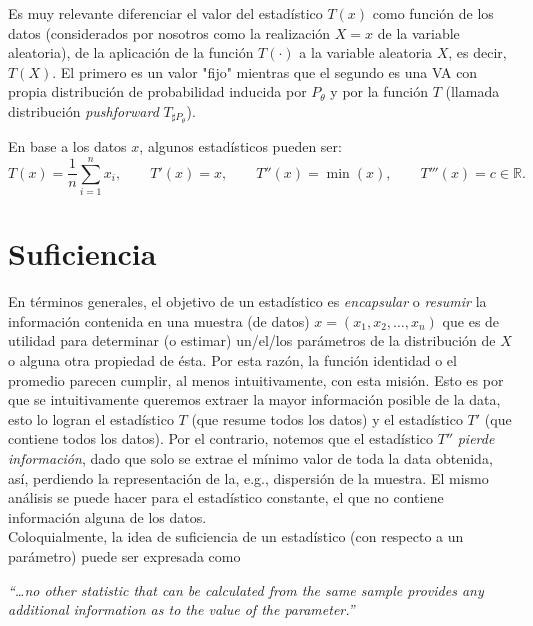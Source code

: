 \begin{remark}
Es muy relevante diferenciar el valor del estadístico $T(x)$ como función de los datos (considerados por nosotros como la realización $X=x$ de la variable aleatoria), de la aplicación de la función $T(\cdot)$ a la variable aleatoria $X$, es decir, $T(X)$. El primero es un valor "fijo" mientras que el segundo es una VA con propia distribución de probabilidad inducida por $P_\theta$ y por la función $T$ (llamada distribución \emph{pushforward} $T_{\sharp P_\theta}$).\\ 
\end{remark}


En base a los datos $x$, algunos estadísticos pueden ser: 
\begin{equation}
\nonumber
	T(x) = \frac{1}{n}\sum_{i=1}^nx_i,\qquad T'(x) = x, \qquad T''(x) = \min(x), \qquad T'''(x) = c\in \mathbb{R}.
\end{equation}

\section{Suficiencia}
En términos generales, el objetivo de un estadístico es \textit{encapsular} o \textit{resumir} la información contenida en una muestra (de datos) $x = (x_1,x_2,\ldots,x_n)$ que es de utilidad para determinar (o estimar) un/el/los parámetros de la distribución de $X$ o alguna otra propiedad de ésta. Por esta razón, la función identidad o el promedio parecen cumplir, al menos intuitivamente, con esta misión. Esto es por que se intuitivamente queremos extraer la mayor información posible de la data, esto lo logran el estadístico $T$ (que resume todos los datos) y el estadístico $T'$ (que contiene todos los datos). Por el contrario, notemos que el estadístico $T''$ \emph{pierde información}, dado que solo se extrae el mínimo valor de toda la data obtenida, así, perdiendo la representación de la, e.g., dispersión de la muestra. El mismo análisis se puede hacer para el estadístico constante, el que no contiene  información alguna de los datos.\\

Coloquialmente, la idea de suficiencia de un estadístico (con respecto a un parámetro) puede ser expresada como  
\begin{displayquote} \it
“…no other statistic that can be calculated from the same sample provides any additional information as to the value of the parameter.”
\end{displayquote}


